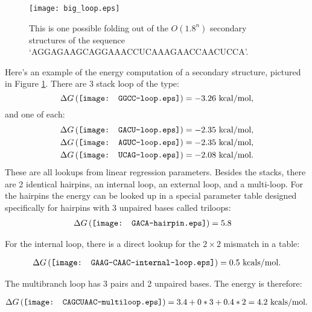 \begin{figure}[t]
  \texttt{[image: big\_loop.eps]}

  \captionsetup{singlelinecheck=off}
  \caption[.]{
    This is one possible folding out of the $O(1.8^n)$ secondary
    structures of the sequence
    `AGGAGAAGCAGGAAACCUCAAAGAACCAACUCCA'.    
  }
  \label{fig:bigLoop}
\end{figure}

Here's an example of the energy computation of a secondary structure,
pictured in Figure \ref{fig:bigLoop}. There are 3 stack loop of the type:
\begin{equation}
  \Delta G \left ( \vcenter{\hbox{\texttt{[image: GGCC-loop.eps]}}}
  \right ) = -3.26 \text{ kcal/mol},
\end{equation}
and one of each:
\begin{align}
  &\Delta G \left ( \vcenter{\hbox{\texttt{[image: GACU-loop.eps]}}}
  \right ) = -2.35 \text{ kcal/mol},\\ 
  &\Delta G \left ( \vcenter{\hbox{\texttt{[image: AGUC-loop.eps]}}}
  \right ) = -2.35 \text{ kcal/mol},\\
  &\Delta G \left ( \vcenter{\hbox{\texttt{[image: UCAG-loop.eps]}}}
  \right ) = -2.08 \text{ kcal/mol}.
\end{align}
These are all lookups from linear regression parameters. Besides the
stacks, there are 2 identical hairpins, an internal loop, an external
loop, and a multi-loop. For the hairpins the energy can be looked up
in a special parameter table designed specifically for hairpins with 3
unpaired bases called triloops:
\begin{align}
  \Delta G \left ( \vcenter{\hbox{\texttt{[image: GACA-hairpin.eps]}}}
  \right ) &= 5.8
\end{align}

For the internal loop, there is a direct lookup for the $2 \times 2$
mismatch in a table:

\begin{align}
  \Delta G \left ( \vcenter{\hbox{\texttt{[image: GAAG-CAAC-internal-loop.eps]}}}
  \right ) = 0.5 \text{ kcals/mol}.
\end{align}

The multibranch loop has 3 pairs and 2 unpaired bases. The energy is therefore:

\begin{align}
  \Delta G \left (\vcenter{\hbox{\texttt{[image: CAGCUAAC-multiloop.eps]}}}
  \right ) = 3.4 + 0*3 + 0.4*2 = 4.2 \text{ kcals/mol}.
\end{align}


